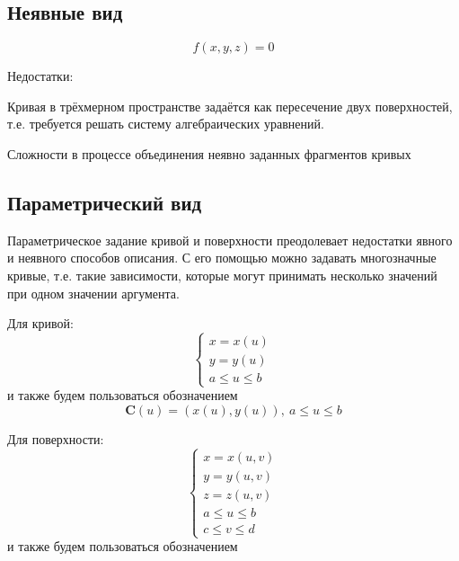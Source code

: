 \documentclass{bmstu}
\newenvironment{gost-itemize}
{\begin{itemize}[label=---,itemindent=\parindent,leftmargin=0pt]}
	{\end{itemize}}
\begin{document}
\subsection{Неявные вид}

\begin{equation*}
    f(x,y,z) = 0
\end{equation*}

Недостатки:
\begin{gost-itemize}
    \item Кривая в трёхмерном пространстве задаётся как пересечение двух поверхностей, т.е. требуется решать систему алгебраических уравнений.
    \item Сложности в процессе объединения неявно заданных фрагментов кривых
\end{gost-itemize}

\subsection{Параметрический вид}

Параметрическое  задание кривой и поверхности преодолевает недостатки явного и неявного способов описания. С его помощью можно задавать многозначные кривые, т.е. такие зависимости, которые могут принимать несколько значений при одном значении аргумента.

Для кривой:
\begin{equation}
    \begin{cases}
        x = x(u) \\
        y = y(u) \\
        a \le u \le b
    \end{cases}
\end{equation}
и также будем пользоваться обозначением
\begin{equation}
    \mathbf{C}(u) = (x(u), y(u)),~        a \le u \le b
\end{equation}

Для поверхности:
\begin{equation}
    \begin{cases}
        x = x(u, v)   \\
        y = y(u, v)   \\
        z = z(u, v)   \\
        a \le u \le b \\
        c \le v \le d
    \end{cases}
\end{equation}
и также будем пользоваться обозначением
\end{document}
